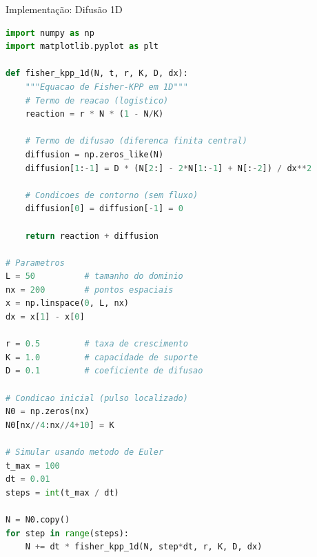 \begin{frame}[fragile]{Implementação: Difusão 1D}
\begin{lstlisting}[language=Python, caption=Equação de Fisher-KPP em 1D, basicstyle=\ttfamily\footnotesize]
import numpy as np
import matplotlib.pyplot as plt

def fisher_kpp_1d(N, t, r, K, D, dx):
    """Equacao de Fisher-KPP em 1D"""
    # Termo de reacao (logistico)
    reaction = r * N * (1 - N/K)

    # Termo de difusao (diferenca finita central)
    diffusion = np.zeros_like(N)
    diffusion[1:-1] = D * (N[2:] - 2*N[1:-1] + N[:-2]) / dx**2

    # Condicoes de contorno (sem fluxo)
    diffusion[0] = diffusion[-1] = 0

    return reaction + diffusion

# Parametros
L = 50          # tamanho do dominio
nx = 200        # pontos espaciais
x = np.linspace(0, L, nx)
dx = x[1] - x[0]

r = 0.5         # taxa de crescimento
K = 1.0         # capacidade de suporte
D = 0.1         # coeficiente de difusao

# Condicao inicial (pulso localizado)
N0 = np.zeros(nx)
N0[nx//4:nx//4+10] = K

# Simular usando metodo de Euler
t_max = 100
dt = 0.01
steps = int(t_max / dt)

N = N0.copy()
for step in range(steps):
    N += dt * fisher_kpp_1d(N, step*dt, r, K, D, dx)
\end{lstlisting}
\end{frame}

